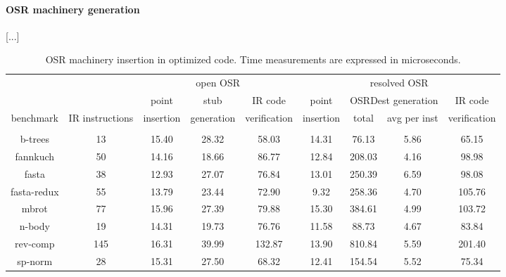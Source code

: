 \paragraph{OSR machinery generation}
[...]

\begin{table} 
    \begin{tabular}{ |c|c|c|c|c|c|c|c|c| }
        \cline{3-9}
        \multicolumn{2}{l|}{} & \multicolumn{3}{c|}{open OSR} & \multicolumn{4}{c|}{resolved OSR} \\ 
        \cline{3-9}
        \multicolumn{2}{l|}{} & point & stub & IR code & point & \multicolumn{2}{|c|}{OSRDest generation} & IR code \\ 
        \cline{1-2} \cline{7-8}
        benchmark & IR instructions & insertion & generation & verification & insertion & total & avg per inst & verification \\ 
        \hline
         &  &  &  &  &  &  &  &  \\ 
        b-trees & 13 & 15.40 & 28.32 & 58.03 & 14.31 & 76.13 & 5.86 & 65.15 \\
        \hline
        fannkuch & 50 & 14.16 & 18.66 & 86.77 & 12.84 & 208.03 & 4.16 & 98.98 \\
        \hline
        fasta & 38 & 12.93 & 27.07 & 76.84 & 13.01 & 250.39 & 6.59 & 98.08 \\
        \hline
        fasta-redux & 55 & 13.79 & 23.44 & 72.90 & 9.32 & 258.36 & 4.70 & 105.76 \\
        \hline
        mbrot & 77 & 15.96 & 27.39 & 79.88 & 15.30 & 384.61 & 4.99 & 103.72 \\
        \hline
        n-body & 19 & 14.31 & 19.73 & 76.76 & 11.58 & 88.73 & 4.67 & 83.84  \\
        \hline
        rev-comp & 145 & 16.31 & 39.99 & 132.87 & 13.90 & 810.84 & 5.59 & 201.40 \\
        \hline
        sp-norm & 28 & 15.31 & 27.50 & 68.32 & 12.41 & 154.54 & 5.52 & 75.34 \\ 
        \hline
    \end{tabular} 
\caption{\label{tab:instrTime} OSR machinery insertion in optimized code. Time measurements are expressed in microseconds.} 
\end{table}
  

  
  
  
  
  
  
  
  
  
  
  
  
  
  
  
  
  
  
  
  
  
  
  
  